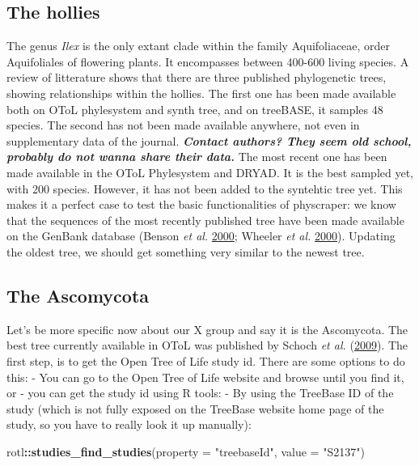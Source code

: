 \documentclass[]{article}
\newenvironment{Shaded}{\begin{snugshade}}{\end{snugshade}}
\newcommand{\DataTypeTok}[1]{\textcolor[rgb]{0.13,0.29,0.53}{#1}}
\newcommand{\KeywordTok}[1]{\textcolor[rgb]{0.13,0.29,0.53}{\textbf{#1}}}
\newcommand{\NormalTok}[1]{#1}
\newcommand{\OperatorTok}[1]{\textcolor[rgb]{0.81,0.36,0.00}{\textbf{#1}}}
\newcommand{\StringTok}[1]{\textcolor[rgb]{0.31,0.60,0.02}{#1}}
\begin{document}
\hypertarget{the-hollies}{%
\subsection{The hollies}\label{the-hollies}}

The genus \emph{Ilex} is the only extant clade within the family Aquifoliaceae, order Aquifoliales of flowering plants.
It encompasses between 400-600 living species. A review of litterature shows that there are three published phylogenetic trees, showing relationships within the hollies.
The first one has been made available both on OToL phylesystem and synth tree, and on treeBASE, it samples 48 species.
The second has not been made available anywhere, not even in supplementary data of the journal.
\textbf{\emph{Contact authors? They seem old school, probably do not wanna share their data.}}
The most recent one has been made available in the OToL Phylesystem and DRYAD. It is the best sampled yet, with 200 species. However,
it has not been added to the syntehtic tree yet.
This makes it a perfect case to test the basic functionalities of physcraper: we know that the sequences of the most recently published tree have been made available on the GenBank database (Benson \emph{et al.} \protect\hyperlink{ref-benson2000genbank}{2000}; Wheeler \emph{et al.} \protect\hyperlink{ref-wheeler2000database}{2000}). Updating the oldest tree, we should get something very similar to the newest tree.

\hypertarget{the-ascomycota}{%
\subsection{The Ascomycota}\label{the-ascomycota}}

Let's be more specific now about our X group and say it is the Ascomycota.
The best tree currently available in OToL was published by Schoch \emph{et al.} (\protect\hyperlink{ref-schoch2009ascomycota}{2009}).
The first step, is to get the Open Tree of Life study id. There are some options to do this:
- You can go to the Open Tree of Life website and browse until you find it, or
- you can get the study id using R tools:
- By using the TreeBase ID of the study (which is not fully exposed on the
TreeBase website home page of the study, so you have to really look it up manually):

\begin{Shaded}
\begin{Highlighting}[]
\NormalTok{rotl}\OperatorTok{::}\KeywordTok{studies_find_studies}\NormalTok{(}\DataTypeTok{property =} \StringTok{"treebaseId"}\NormalTok{, }\DataTypeTok{value =} \StringTok{"S2137"}\NormalTok{)}
\end{Highlighting}
\end{Shaded}
\end{document}
